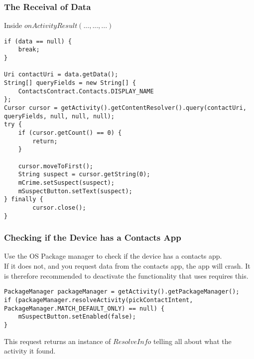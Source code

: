 \documentclass[]{article}
\begin{document}
\subsubsection{The Receival of Data}
Inside $onActivityResult(...,...,...)$
\begin{lstlisting}
if (data == null) {
	break;
}

Uri contactUri = data.getData();
String[] queryFields = new String[] {
	ContactsContract.Contacts.DISPLAY_NAME
};
Cursor cursor = getActivity().getContentResolver().query(contactUri, queryFields, null, null, null);
try {
	if (cursor.getCount() == 0) {
		return;
	}

	cursor.moveToFirst();
	String suspect = cursor.getString(0);
	mCrime.setSuspect(suspect);
	mSuspectButton.setText(suspect);
} finally {
		cursor.close();
}
\end{lstlisting}

\subsubsection{Checking if the Device has a Contacts App}
Use the OS Package manager to check if the device has a contacts app.
\\
If it does not, and you request data from the contacts app, the app will crash.  It is therefore recommended to deactivate the functionality that uses requires this.
\begin{lstlisting}
PackageManager packageManager = getActivity().getPackageManager();
if (packageManager.resolveActivity(pickContactIntent, PackageManager.MATCH_DEFAULT_ONLY) == null) {
	mSuspectButton.setEnabled(false);
}
\end{lstlisting}
This request returns an instance of $ResolveInfo$ telling all about what the activity it found.
\end{document}
